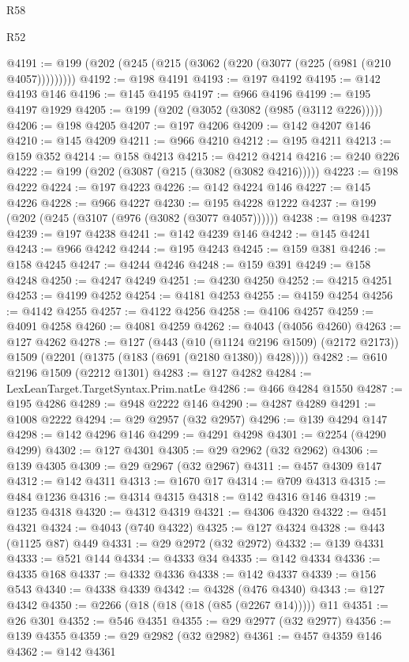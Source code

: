 \begin{lexlean}{R58}
\begin{lexlean}{R52}
\begin{coremodule}
{{{{{{{{{{{{{{{{{{{{{{{{{{{{{{{{{{{{{{{{{{{{{{{{{{{{{{{{{{{{{{{{{{{{{{{{{{{{{{{{{{{{{{{{{{{{{{{{{{{{{{{{{{{{{{{{{{{{{{{{{{{{{{{{{{{{{{{{{{{{{{{{{{{{{{{{{{{{{{{{{{{{{{{{{{{{{{{{{{{{{{{{{{{{{{{{{{{{{{@4191 := @199 (@202 (@245 (@215 (@3062 (@220 (@3077 (@225 (@981 (@210 @4057)))))))))
@4192 := @198 @4191
@4193 := @197 @4192
@4195 := @142 @4193 @146
@4196 := @145 @4195
@4197 := @966 @4196
@4199 := @195 @4197 @1929
@4205 := @199 (@202 (@3052 (@3082 (@985 (@3112 @226)))))
@4206 := @198 @4205
@4207 := @197 @4206
@4209 := @142 @4207 @146
@4210 := @145 @4209
@4211 := @966 @4210
@4212 := @195 @4211
@4213 := @159 @352
@4214 := @158 @4213
@4215 := @4212 @4214
@4216 := @240 @226
@4222 := @199 (@202 (@3087 (@215 (@3082 (@3082 @4216)))))
@4223 := @198 @4222
@4224 := @197 @4223
@4226 := @142 @4224 @146
@4227 := @145 @4226
@4228 := @966 @4227
@4230 := @195 @4228 @1222
@4237 := @199 (@202 (@245 (@3107 (@976 (@3082 (@3077 @4057))))))
@4238 := @198 @4237
@4239 := @197 @4238
@4241 := @142 @4239 @146
@4242 := @145 @4241
@4243 := @966 @4242
@4244 := @195 @4243
@4245 := @159 @381
@4246 := @158 @4245
@4247 := @4244 @4246
@4248 := @159 @391
@4249 := @158 @4248
@4250 := @4247 @4249
@4251 := @4230 @4250
@4252 := @4215 @4251
@4253 := @4199 @4252
@4254 := @4181 @4253
@4255 := @4159 @4254
@4256 := @4142 @4255
@4257 := @4122 @4256
@4258 := @4106 @4257
@4259 := @4091 @4258
@4260 := @4081 @4259
@4262 := @4043 (@4056 @4260)
@4263 := @127 @4262
@4278 := @127
    (@443
      (@10 (@1124 @2196 @1509) (@2172 @2173))
      @1509
      (@2201 (@1375 (@183 (@691 (@2180 @1380)) @428))))
@4282 := @610 @2196 @1509 (@2212 @1301)
@4283 := @127 @4282
@4284 := LexLeanTarget.TargetSyntax.Prim.natLe
@4286 := @466 @4284 @1550
@4287 := @195 @4286
@4289 := @948 @2222 @146
@4290 := @4287 @4289
@4291 := @1008 @2222
@4294 := @29 @2957 (@32 @2957)
@4296 := @139 @4294 @147
@4298 := @142 @4296 @146
@4299 := @4291 @4298
@4301 := @2254 (@4290 @4299)
@4302 := @127 @4301
@4305 := @29 @2962 (@32 @2962)
@4306 := @139 @4305
@4309 := @29 @2967 (@32 @2967)
@4311 := @457 @4309 @147
@4312 := @142 @4311
@4313 := @1670 @17
@4314 := @709 @4313
@4315 := @484 @1236
@4316 := @4314 @4315
@4318 := @142 @4316 @146
@4319 := @1235 @4318
@4320 := @4312 @4319
@4321 := @4306 @4320
@4322 := @451 @4321
@4324 := @4043 (@740 @4322)
@4325 := @127 @4324
@4328 := @443 (@1125 @87) @449
@4331 := @29 @2972 (@32 @2972)
@4332 := @139 @4331
@4333 := @521 @144
@4334 := @4333 @34
@4335 := @142 @4334
@4336 := @4335 @168
@4337 := @4332 @4336
@4338 := @142 @4337
@4339 := @156 @543
@4340 := @4338 @4339
@4342 := @4328 (@476 @4340)
@4343 := @127 @4342
@4350 := @2266 (@18 (@18 (@18 (@85 (@2267 @14))))) @11
@4351 := @26 @301
@4352 := @546 @4351
@4355 := @29 @2977 (@32 @2977)
@4356 := @139 @4355
@4359 := @29 @2982 (@32 @2982)
@4361 := @457 @4359 @146
@4362 := @142 @4361
}}}}}}}}}}}}}}}}}}}}}}}}}}}}}}}}}}}}}}}}}}}}}}}}}}}}}}}}}}}}}}}}}}}}}}}}}}}}}}}}}}}}}}}}}}}}}}}}}}}}}}}}}}}}}}}}}}}}}}}}}}}}}}}}}}}}}}}}}}}}}}}}}}}}}}}}}}}}}}}}}}}}}}}}}}}}}}}}}}}}}}}}}}}}}}}}}}}}}}
\end{coremodule}
\end{lexlean}
\end{lexlean}
